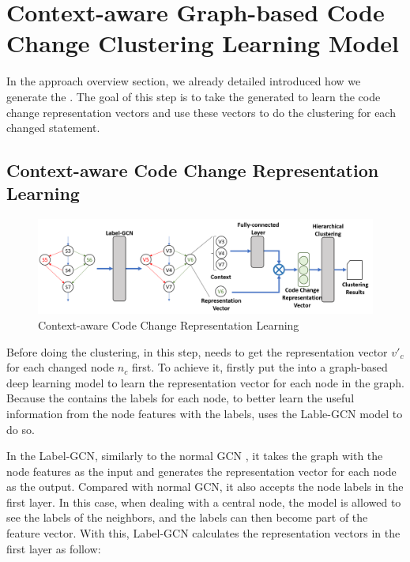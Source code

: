 \section{Context-aware Graph-based Code Change Clustering Learning Model}

In the approach overview section, we already detailed introduced how we generate the {\mvpdg}. The goal of this step is to take the generated {\mvpdg} to learn the code change representation vectors and use these vectors to do the clustering for each changed statement.

\subsection{Context-aware Code Change Representation Learning}

\begin{figure}[t]
	\centering
	\includegraphics[width=6.5in]{figures/STEP_2.png}
	\vspace{-6pt}
	\caption{Context-aware Code Change Representation Learning}
	\label{fig:step-2}
\end{figure}

Before doing the clustering, in this step, \tool needs to get the representation vector $v'_c$ for each changed node $n_c$ first. To achieve it, \tool firstly put the {\mvpdg} into a graph-based deep learning model to learn the representation vector for each node in the graph. Because the {\mvpdg} contains the labels for each node, to better learn the useful information from the node features with the labels, \tool uses the Lable-GCN \cite{} model to do so. 

In the Label-GCN, similarly to the normal GCN \cite{}, it takes the graph with the node features as the input and generates the representation vector for each node as the output. Compared with normal GCN, it also accepts the node labels in the first layer. In this case, when dealing with a central node, the model is allowed to see the labels of the neighbors, and the labels can then become part of the feature vector. With this, Label-GCN calculates the representation vectors in the first layer as follow:

